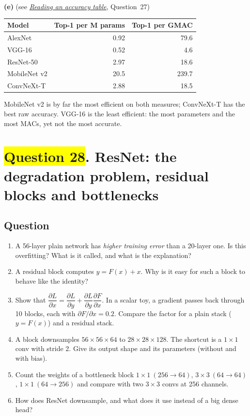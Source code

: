 \documentclass[12pt,a4paper]{article}
\newcommand{\seeconcept}[3]{(see \hyperref[#1]{\textit{#2}}, Question~#3)}
\newcommand{\hlq}[1]{{\setlength{\fboxsep}{1.5pt}\colorbox{yellow}{#1}}}
\begin{document}
\textbf{(e)} \seeconcept{c:readtable}{Reading an accuracy table}{27}
\begin{center}
\begin{tabular}{@{}lrr@{}}
\toprule
Model & Top-1 per M params & Top-1 per GMAC\\
\midrule
AlexNet & 0.92 & 79.6\\
VGG-16 & 0.52 & 4.6\\
ResNet-50 & 2.97 & 18.6\\
MobileNet v2 & 20.5 & 239.7\\
ConvNeXt-T & 2.88 & 18.5\\
\bottomrule
\end{tabular}
\end{center}
MobileNet v2 is by far the most efficient on both measures; ConvNeXt-T has the best raw accuracy. VGG-16 is the least efficient: the most parameters and the most MACs, yet not the most accurate.

\section[Question 28. ResNet: the degradation problem, residual blocks and bottlenecks]{\hlq{Question 28}. ResNet: the degradation problem, residual blocks and bottlenecks}
\subsection*{Question}
\begin{enumerate}[label=(\alph*)]
\item A 56-layer plain network has \emph{higher training error} than a 20-layer one. Is this overfitting? What is it called, and what is the explanation?
\item A residual block computes $y=F(x)+x$. Why is it easy for such a block to behave like the identity?
\item Show that $\dfrac{\partial L}{\partial x}=\dfrac{\partial L}{\partial y}+\dfrac{\partial L}{\partial y}\dfrac{\partial F}{\partial x}$. In a scalar toy, a gradient passes back through 10 blocks, each with $\partial F/\partial x=0.2$. Compare the factor for a plain stack ($y=F(x)$) and a residual stack.
\item A block downsamples $56\times56\times64$ to $28\times28\times128$. The shortcut is a $1\times1$ conv with stride 2. Give its output shape and its parameters (without and with bias).
\item Count the weights of a bottleneck block $1\times1\ (256\to64)$, $3\times3\ (64\to64)$, $1\times1\ (64\to256)$ and compare with two $3\times3$ convs at 256 channels.
\item How does ResNet downsample, and what does it use instead of a big dense head?
\end{enumerate}
\end{document}
